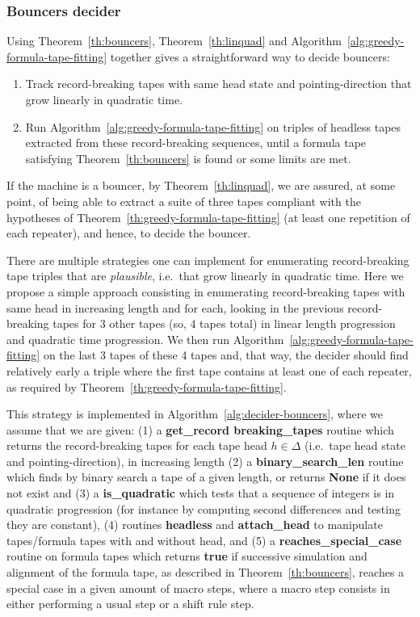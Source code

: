 \subsubsection{Bouncers decider}

Using Theorem~\ref{th:bouncers}, Theorem~\ref{th:linquad} and Algorithm~\ref{alg:greedy-formula-tape-fitting} together gives a straightforward way to decide bouncers:

\begin{enumerate}
    \item Track record-breaking tapes with same head state and pointing-direction that grow linearly in quadratic time.
    \item Run Algorithm~\ref{alg:greedy-formula-tape-fitting} on triples of headless tapes extracted from these record-breaking sequences, until a formula tape satisfying Theorem~\ref{th:bouncers} is found or some limits are met.


\end{enumerate}


If the machine is a bouncer, by Theorem~\ref{th:linquad}, we are assured, at some point, of being able to extract a suite of three tapes compliant with the hypotheses of Theorem~\ref{th:greedy-formula-tape-fitting} (at least one repetition of each repeater), and hence, to decide the bouncer.

There are multiple strategies one can implement for enumerating record-breaking tape triples that are \textit{plausible}, i.e.\ that grow linearly in quadratic time. Here we propose a simple approach consisting in enumerating record-breaking tapes with same head in increasing length and for each, looking in the previous record-breaking tapes  for 3 other tapes (so, 4 tapes total) in linear length progression and quadratic time progression. We then run Algorithm~\ref{alg:greedy-formula-tape-fitting} on the last 3 tapes of these 4 tapes and, that way, the decider should find relatively early a triple where the first tape contains at least one of each repeater, as required by Theorem~\ref{th:greedy-formula-tape-fitting}.

This strategy is implemented in Algorithm~\ref{alg:decider-bouncers}, where we assume that we are given: (1) a \textbf{get\_record breaking\_tapes} routine which returns the record-breaking tapes for each tape head $h\in\Delta$ (i.e.\ tape head state and pointing-direction), in increasing length (2) a \textbf{binary\_search\_len} routine which finds by binary search a tape of a given length, or returns \textbf{None} if it does not exist and (3) a \textbf{is\_quadratic} which tests that a sequence of integers is in quadratic progression (for instance by computing second differences and testing they are constant), (4) routines \textbf{headless} and \textbf{attach\_head} to manipulate tapes/formula tapes with and without head, and (5) a \textbf{reaches\_special\_case} routine on formula tapes which returns \textbf{true} if successive simulation and alignment of the formula tape, as described in Theorem~\ref{th:bouncers}, reaches a special case in a given amount of macro steps, where a macro step consists in either performing a usual step or a shift rule step.

